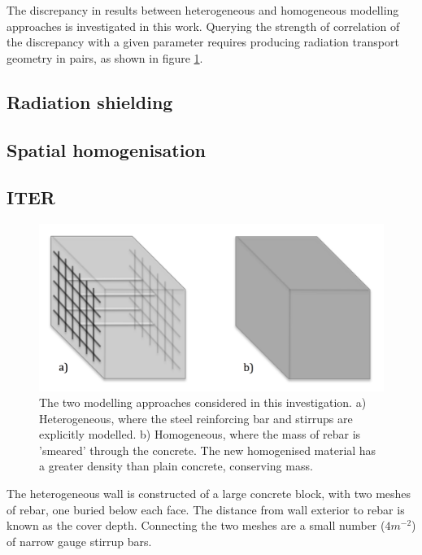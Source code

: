 The discrepancy in results between heterogeneous and homogeneous modelling approaches is investigated in this work. Querying the strength of correlation of the discrepancy with a given parameter requires producing radiation transport geometry in pairs, as shown in figure \ref{fig:wall_diagram}. 

\subsection{Radiation shielding}
% 

\subsection{Spatial homogenisation}

\subsection{ITER}

\begin{figure}[H]
	\includegraphics[width=\textwidth]{wall_diagram}
	\caption{The two modelling approaches considered in this investigation. a) Heterogeneous, where the steel reinforcing bar and stirrups are explicitly modelled. b) Homogeneous, where the mass of rebar is 'smeared' through the concrete. The new homogenised material has a greater density than plain concrete, conserving mass.}
	\label{fig:wall_diagram}
\end{figure}

The heterogeneous wall is constructed of a large concrete block, with two meshes of rebar, one buried below each face. The distance from wall exterior to rebar is known as the cover depth. Connecting the two meshes are a small number ($4m^{-2}$) of narrow gauge stirrup bars.

